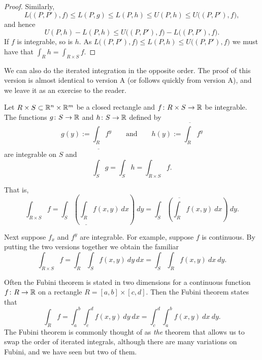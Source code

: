 \begin{proof}
Similarly,
\begin{equation*}
L\bigl((P,P'),f\bigr)
\leq
L(P,g) \leq
L(P,h) \leq
U(P,h) \leq
U\bigl((P,P'),f\bigr) ,
\end{equation*}
and hence
\begin{equation*}
U(P,h) - L(P,h)
\leq
U\bigl((P,P'),f\bigr) -
L\bigl((P,P'),f\bigr) .
\end{equation*}
If $f$ is integrable, so is $h$.
As $L\bigl((P,P'),f\bigr) \leq L(P,h) \leq U\bigl((P,P'),f\bigr)$ we must have
that $\int_R h = \int_{R \times S} f$.
\end{proof}

We can also do the iterated integration in the opposite order.
The proof of this version is almost identical to version A
(or follows quickly from version A)\@, and
we leave it as an exercise to the reader.

\begin{thm}\label{mv:fubinivB}
Let $R \times S \subset {\mathbb{R}}^n \times {\mathbb{R}}^m$ be a closed rectangle and
$f \colon R \times S \to {\mathbb{R}}$ be integrable.
The functions $g \colon S \to {\mathbb{R}}$ and $h \colon S \to {\mathbb{R}}$ defined by
\begin{equation*}
g(y) := \underline{\int_R} f^y \qquad
\text{and} \qquad
h(y) := \overline{\int_R} f^y 
\end{equation*}
are integrable on $S$ and
\begin{equation*}
\int_S g = \int_S h = \int_{R \times S} f .
\end{equation*}
\end{thm}

That is,
\begin{equation*}
\int_{R \times S} f
=
 \int_S \left(
 \underline{\int_R} f(x,y) ~ dx
\right) ~ dy
=
 \int_S \left(
 \overline{\int_R} f(x,y) ~ dx
\right) ~ dy .
\end{equation*}

Next suppose $f_x$ and $f^y$ are integrable.
For example, suppose $f$ is continuous.  By
putting the two versions together we obtain the familiar
\begin{equation*}
\int_{R \times S} f
=
 \int_R 
 \int_S f(x,y) ~ dy ~ dx 
=
 \int_S 
 \int_R f(x,y) ~ dx ~ dy .
\end{equation*}

Often the Fubini theorem is stated in two dimensions
for a continuous function $f \colon R \to
{\mathbb{R}}$ on a rectangle $R = [a,b] \times [c,d]$.  Then the Fubini theorem
states that
\begin{equation*}
\int_R f = \int_a^b \int_c^d f(x,y) ~dy~dx
=
\int_c^d \int_a^b f(x,y) ~dx~dy .
\end{equation*}
The Fubini theorem is commonly thought of as \emph{the} theorem that allows us
to swap the order of iterated integrals, although there are many variations
on Fubini, and we have seen but two of them.

